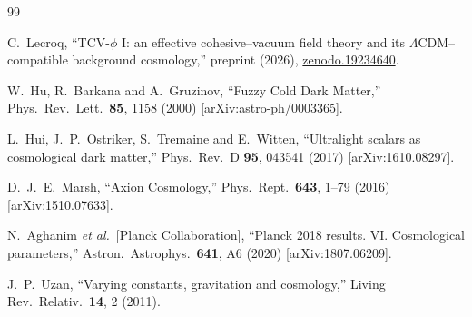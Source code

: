 \documentclass[aps,prd,onecolumn,nofootinbib,superscriptaddress]{revtex4-2}
\newcommand{\etal}{\textit{et al.}}
\begin{document}
\begin{thebibliography}{99}

C.~Lecroq,
``TCV-$\phi$ I: an effective cohesive--vacuum field theory and its $\Lambda$CDM--compatible background cosmology,''
preprint (2026), \href{https://doi.org/10.5281/zenodo.19234640}{zenodo.19234640}.

W.~Hu, R.~Barkana and A.~Gruzinov,
``Fuzzy Cold Dark Matter,''
Phys.\ Rev.\ Lett.\ \textbf{85}, 1158 (2000)
[arXiv:astro-ph/0003365].

L.~Hui, J.~P.~Ostriker, S.~Tremaine and E.~Witten,
``Ultralight scalars as cosmological dark matter,''
Phys.\ Rev.\ D \textbf{95}, 043541 (2017)
[arXiv:1610.08297].

D.~J.~E.~Marsh,
``Axion Cosmology,''
Phys.\ Rept.\ \textbf{643}, 1--79 (2016)
[arXiv:1510.07633].

N.~Aghanim \etal\ [Planck Collaboration],
``Planck 2018 results. VI. Cosmological parameters,''
Astron.\ Astrophys.\ \textbf{641}, A6 (2020)
[arXiv:1807.06209].

J.~P.~Uzan,
``Varying constants, gravitation and cosmology,''
Living Rev.\ Relativ.\ \textbf{14}, 2 (2011).

\end{thebibliography}
\end{document}
